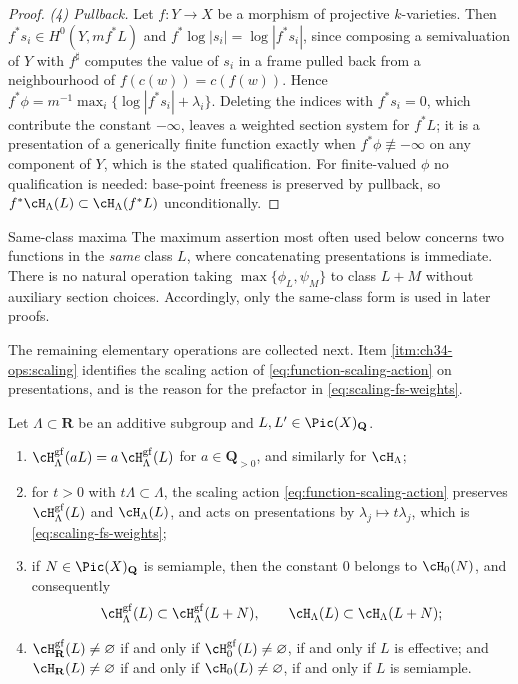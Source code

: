 \begin{proof}
\emph{(4) Pullback.}  Let $f:Y\to X$ be a morphism of projective
$k$-varieties.  Then $f^*s_i\in H^0(Y,mf^*L)$ and
$f^*\log|s_i|=\log|f^*s_i|$, since composing a semivaluation of $Y$ with
$f^\sharp$ computes the value of $s_i$ in a frame pulled back from a
neighbourhood of $f(c(w))=c(f(w))$.  Hence
$f^*\phi=m^{-1}\max_i\{\log|f^*s_i|+\lambda_i\}$.  Deleting the indices
with $f^*s_i=0$, which contribute the constant $-\infty$, leaves a
weighted section system for $f^*L$; it is a presentation of a generically
finite function exactly when $f^*\phi\not\equiv-\infty$ on any component
of $Y$, which is the stated qualification.  For finite-valued $\phi$ no
qualification is needed: base-point freeness is preserved by pullback, so
$f^*\cH_\Lambda(L)\subset\cH_\Lambda(f^*L)$ unconditionally.
\end{proof}

\begin{warning}{Same-class maxima}
The maximum assertion most often used below concerns two functions in the
\emph{same} class $L$, where concatenating presentations is immediate.
There is no natural operation taking $\max\{\phi_L,\psi_M\}$ to class
$L+M$ without auxiliary section choices.  Accordingly, only the
same-class form is used in later proofs.
\end{warning}

The remaining elementary operations are collected next.  Item
\cref{itm:ch34-ops:scaling} identifies the scaling action of
\eqref{eq:function-scaling-action} on presentations, and is the reason for
the prefactor in \eqref{eq:scaling-fs-weights}.

\begin{proposition}
\label{prop:ch34-fs-operations}
Let $\Lambda\subset\mathbf R$ be an additive subgroup and
$L,L'\in\Pic(X)_{\mathbf Q}$.
\begin{enumerate}
\item\label{itm:ch34-ops:rational}
  $\cH^{\mathrm{gf}}_\Lambda(aL)=a\,\cH^{\mathrm{gf}}_\Lambda(L)$ for
  $a\in\mathbf Q_{>0}$, and similarly for $\cH_\Lambda$;
\item\label{itm:ch34-ops:scaling}
  for $t>0$ with $t\Lambda\subset\Lambda$, the scaling action
  \eqref{eq:function-scaling-action} preserves
  $\cH^{\mathrm{gf}}_\Lambda(L)$ and $\cH_\Lambda(L)$, and acts on
  presentations by $\lambda_j\mapsto t\lambda_j$, which is
  \eqref{eq:scaling-fs-weights};
\item\label{itm:ch34-ops:semiample}
  if $N\in\Pic(X)_{\mathbf Q}$ is semiample, then the constant $0$
  belongs to $\cH_0(N)$, and consequently
  \[
   \cH^{\mathrm{gf}}_\Lambda(L)\subset\cH^{\mathrm{gf}}_\Lambda(L+N),
   \qquad
   \cH_\Lambda(L)\subset\cH_\Lambda(L+N);
  \]
\item\label{itm:ch34-ops:nonempty}
  $\cH^{\mathrm{gf}}_{\mathbf R}(L)\ne\varnothing$ if and only if
  $\cH^{\mathrm{gf}}_0(L)\ne\varnothing$, if and only if $L$ is
  effective; and $\cH_{\mathbf R}(L)\ne\varnothing$ if and only if
  $\cH_0(L)\ne\varnothing$, if and only if $L$ is semiample.
\end{enumerate}
\par
\end{proposition}

